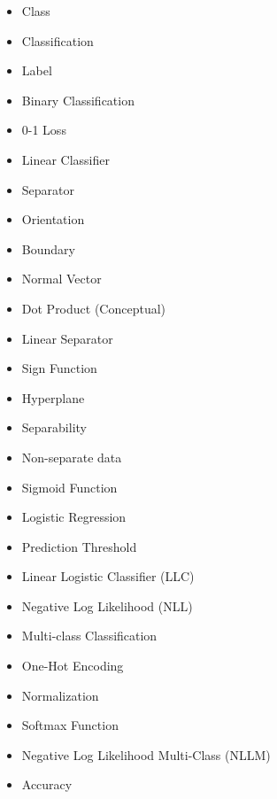     \begin{itemize}
        \item Class
        \item Classification
        \item Label
        \item Binary Classification
        \item 0-1 Loss
        \item Linear Classifier
        \item Separator
        \item Orientation
        \item Boundary
        \item Normal Vector
        \item Dot Product (Conceptual)
        \item Linear Separator
        \item Sign Function
        \item Hyperplane
        \item Separability
        \item Non-separate data
        \item Sigmoid Function
        \item Logistic Regression
        \item Prediction Threshold
        \item Linear Logistic Classifier (LLC)
        \item Negative Log Likelihood (NLL)
        \item Multi-class Classification
        \item One-Hot Encoding
        \item Normalization
        \item Softmax Function
        \item Negative Log Likelihood Multi-Class (NLLM)
        \item Accuracy
    \end{itemize}





